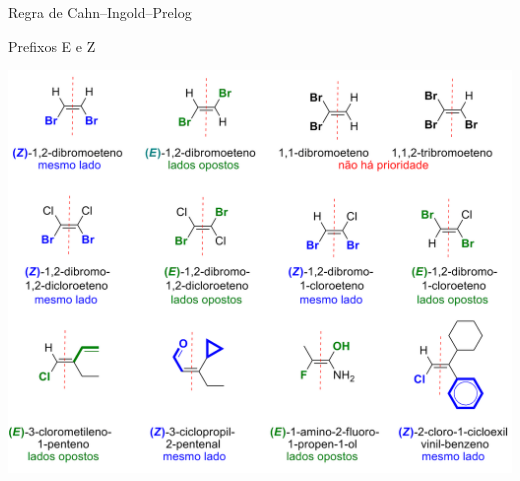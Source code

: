 \documentclass{beamer}
\begin{document}
\begin{frame}[label={sec:org7f9fbec}]{Regra de Cahn–Ingold–Prelog}
\begin{block}{Prefixos E e Z}
\framebreak

\begin{center}
\includegraphics[scale=0.22]{./org_ez.png}
\end{center}
\end{block}
\end{frame}
\end{document}
